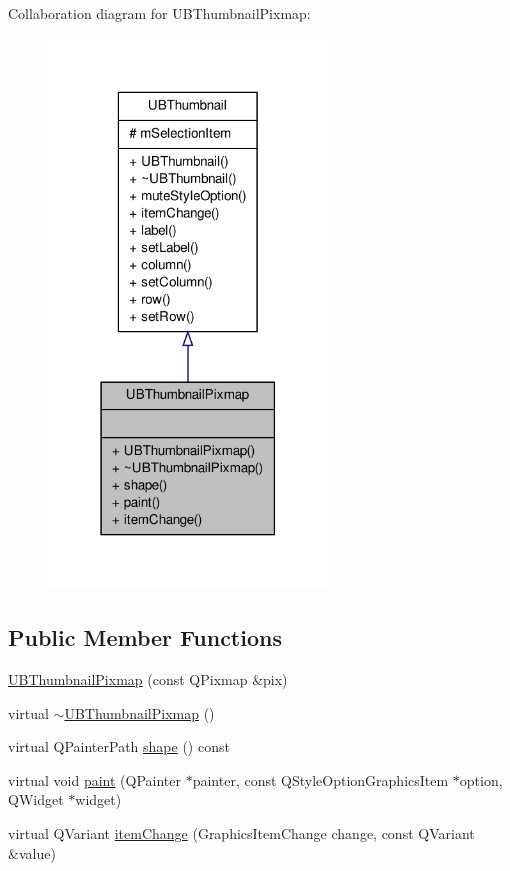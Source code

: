 Collaboration diagram for U\-B\-Thumbnail\-Pixmap\-:
\nopagebreak
\begin{figure}[H]
\begin{center}
\leavevmode
\includegraphics[width=210pt]{d8/d93/class_u_b_thumbnail_pixmap__coll__graph}
\end{center}
\end{figure}
\subsection*{Public Member Functions}
\begin{DoxyCompactItemize}
\item 
\hyperlink{class_u_b_thumbnail_pixmap_ae05b732b7257234c13b08042843e5439}{U\-B\-Thumbnail\-Pixmap} (const Q\-Pixmap \&pix)
\item 
virtual \hyperlink{class_u_b_thumbnail_pixmap_af309912cf5dd01c34a756f5687cea56f}{$\sim$\-U\-B\-Thumbnail\-Pixmap} ()
\item 
virtual Q\-Painter\-Path \hyperlink{class_u_b_thumbnail_pixmap_a65332535c57edfd896ccb4cdd605988b}{shape} () const 
\item 
virtual void \hyperlink{class_u_b_thumbnail_pixmap_a253d9e1e1b1a12ad50dd8c7dc7c8938c}{paint} (Q\-Painter $\ast$painter, const Q\-Style\-Option\-Graphics\-Item $\ast$option, Q\-Widget $\ast$widget)
\item 
virtual Q\-Variant \hyperlink{class_u_b_thumbnail_pixmap_a34f4cefa427fd9473f1c678d6e32c855}{item\-Change} (Graphics\-Item\-Change change, const Q\-Variant \&value)
\end{DoxyCompactItemize}
